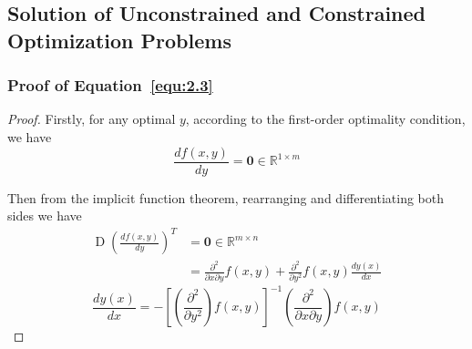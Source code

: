 \subsection{Solution of Unconstrained and Constrained Optimization Problems}
\subsubsection{Proof of Equation~\ref{equ:2.3}}
\label{appendix:equ2.3}
\begin{proof}
    Firstly, for any optimal $y$, according to the first-order optimality condition, we have
    $$
    \frac{df(x, y)}{dy} = \boldsymbol{0} \in \mathbb{R}^{1 \times m}
    $$
    \par Then from the implicit function theorem, rearranging and differentiating both sides we have
    $$
    \begin{aligned}
        \operatorname{D}(\frac{df(x, y)}{dy})^T &= \boldsymbol{0} \in \mathbb{R}^{m \times n} \\
        &= \frac{\partial^{2}}{\partial x \partial y}f(x,y) + \frac{\partial^2}{\partial y^2}f(x, y) \frac{dy(x)}{dx}
    \end{aligned}
    $$
    $$ \frac{dy(x)}{dx} = -[(\frac{\partial^2}{\partial y^2})f(x,y)]^{-1} (\frac{\partial^2}{\partial x \partial y})f(x, y)
    $$
\end{proof}

